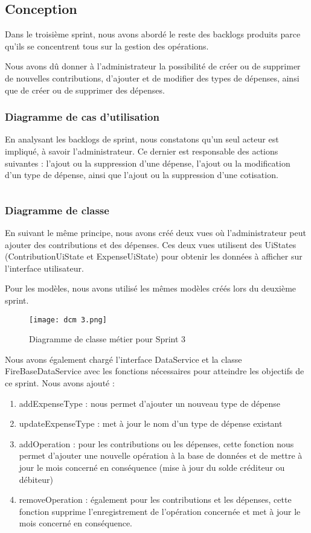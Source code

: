 \subsection{Conception}
Dans le troisième sprint, nous avons abordé le reste des backlogs produits parce qu'ils se concentrent tous sur la gestion des opérations. 

Nous avons dû donner à l'administrateur la possibilité de créer ou de supprimer de nouvelles contributions, d'ajouter et de modifier des types de dépenses, ainsi que de créer ou de supprimer des dépenses.

\subsubsection{Diagramme de cas d'utilisation}
En analysant les backlogs de sprint, nous constatons qu'un seul acteur est impliqué, à savoir l'administrateur. Ce dernier est responsable des actions suivantes : l'ajout ou la suppression d'une dépense, l'ajout ou la modification d'un type de dépense, ainsi que l'ajout ou la suppression d'une cotisation.

$ $
\newpage
\subsubsection{Diagramme de classe}
En suivant le même principe, nous avons créé deux vues où l'administrateur peut ajouter des contributions et des dépenses. Ces deux vues utilisent des UiStates (ContributionUiState et ExpenseUiState) pour obtenir les données à afficher sur l'interface utilisateur.

Pour les modèles, nous avons utilisé les mêmes modèles créés lors du deuxième sprint.
 \begin{figure}[h]
        \centering
        \texttt{[image: dcm 3.png]}
        \caption{Diagramme de classe métier pour Sprint 3}
    \end{figure}

Nous avons également chargé l'interface DataService et la classe FireBaseDataService avec les fonctions nécessaires pour atteindre les objectifs de ce sprint. Nous avons ajouté :
\begin{enumerate}
  \item addExpenseType : nous permet d'ajouter un nouveau type de dépense
  \item updateExpenseType : met à jour le nom d'un type de dépense existant
  \item addOperation : pour les contributions ou les dépenses, cette fonction nous permet d'ajouter une nouvelle opération à la base de données et de mettre à jour le mois concerné en conséquence (mise à jour du solde créditeur ou débiteur)
  \item removeOperation : également pour les contributions et les dépenses, cette fonction supprime l'enregistrement de l'opération concernée et met à jour le mois concerné en conséquence.
\end{enumerate}
    
